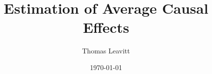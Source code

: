 \documentclass[table, xcolor={dvipsnames}, 9pt]{beamer}
\title[]{Estimation of Average Causal Effects} %
\author{Thomas Leavitt} %
\institute[] %
{
\medskip
\textit{} %
}
\date{\today} %
\theoremstyle{newstyle}
\begin{document}
\begin{frame}
\titlepage %
\end{frame}


\end{document}
